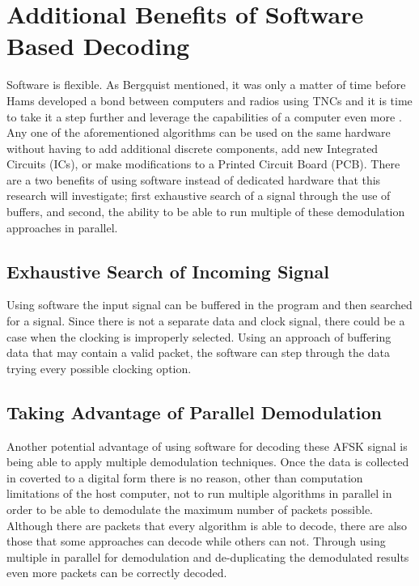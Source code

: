 \section{Additional Benefits of Software Based Decoding}
Software is flexible. As Bergquist mentioned, it was only a matter of time before Hams developed a bond between computers and radios using TNCs and it is time to take it a step further and leverage the capabilities of a computer even more \cite{Bergquist2001}. Any one of the aforementioned algorithms can be used on the same hardware without having to add additional discrete components, add new Integrated Circuits (ICs), or make modifications to a Printed Circuit Board (PCB). There are a two benefits of using software instead of dedicated hardware that this research will investigate; first exhaustive search of a signal through the use of buffers, and second, the ability to be able to run multiple of these demodulation approaches in parallel.

\subsection{Exhaustive Search of Incoming Signal}
Using software the input signal can be buffered in the program and then searched for a signal. Since there is not a separate data and clock signal, there could be a case when the clocking is improperly selected. Using an approach of buffering data that may contain a valid packet, the software can step through the data trying every possible clocking option.

\subsection{Taking Advantage of Parallel Demodulation}
Another potential advantage of using software for decoding these AFSK signal is being able to apply multiple demodulation techniques. Once the data is collected in coverted to a digital form there is no reason, other than computation limitations of the host computer, not to run multiple algorithms in parallel in order to be able to demodulate the maximum number of packets possible. Although there are packets that every algorithm is able to decode, there are also those that some approaches can decode while others can not. Through using multiple in parallel for demodulation and de-duplicating the demodulated results even more packets can be correctly decoded.
